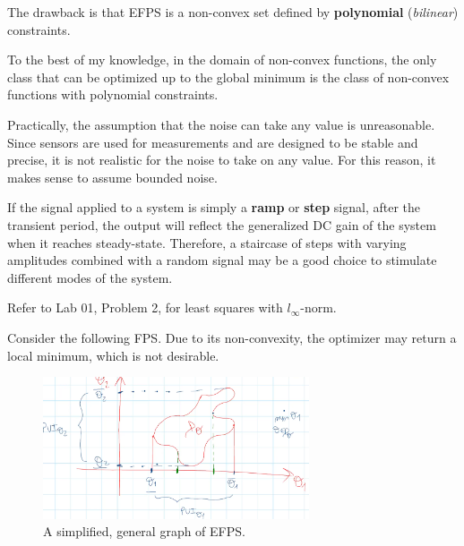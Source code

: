 The drawback is that EFPS is a non-convex set defined by \textbf{polynomial} (\textit{bilinear}) constraints.

\begin{factbox}
To the best of my knowledge, in the domain of non-convex functions, the only class that can be optimized up to the global minimum is the class of non-convex functions with polynomial constraints.
\end{factbox}

\begin{QandAbox}
Practically, the assumption that the noise can take any value is unreasonable. Since sensors are used for measurements and are designed to be stable and precise, it is not realistic for the noise to take on any value. For this reason, it makes sense to assume bounded noise.
\end{QandAbox}

\begin{factbox}
If the signal applied to a system is simply a \textbf{ramp} or \textbf{step} signal, after the transient period, the output will reflect the generalized DC gain of the system when it reaches steady-state. Therefore, a staircase of steps with varying amplitudes combined with a random signal may be a good choice to stimulate different modes of the system.
\end{factbox}

Refer to Lab 01, Problem 2, for least squares with \( l_\infty \)-norm.

Consider the following FPS. Due to its non-convexity, the optimizer may return a local minimum, which is not desirable.

\begin{figure}[htbp]  %
    \centering
    \includegraphics[width=0.7\textwidth]{images/non-convex-FPS.png}
    \caption{A simplified, general graph of EFPS.}
    \label{fig:non-convex-FPS}
\end{figure}



